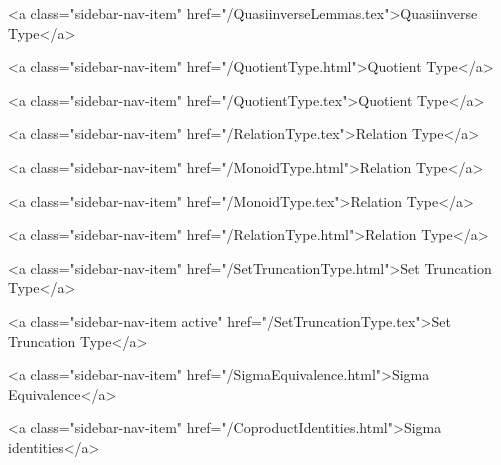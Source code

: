       
    
      
        
          <a class="sidebar-nav-item" href="/QuasiinverseLemmas.tex">Quasiinverse Type</a>
        
      
    
      
        
          <a class="sidebar-nav-item" href="/QuotientType.html">Quotient Type</a>
        
      
    
      
        
          <a class="sidebar-nav-item" href="/QuotientType.tex">Quotient Type</a>
        
      
    
      
        
          <a class="sidebar-nav-item" href="/RelationType.tex">Relation Type</a>
        
      
    
      
        
          <a class="sidebar-nav-item" href="/MonoidType.html">Relation Type</a>
        
      
    
      
        
          <a class="sidebar-nav-item" href="/MonoidType.tex">Relation Type</a>
        
      
    
      
        
          <a class="sidebar-nav-item" href="/RelationType.html">Relation Type</a>
        
      
    
      
        
          <a class="sidebar-nav-item" href="/SetTruncationType.html">Set Truncation Type</a>
        
      
    
      
        
          <a class="sidebar-nav-item active" href="/SetTruncationType.tex">Set Truncation Type</a>
        
      
    
      
        
          <a class="sidebar-nav-item" href="/SigmaEquivalence.html">Sigma Equivalence</a>
        
      
    
      
        
          <a class="sidebar-nav-item" href="/CoproductIdentities.html">Sigma identities</a>
        

